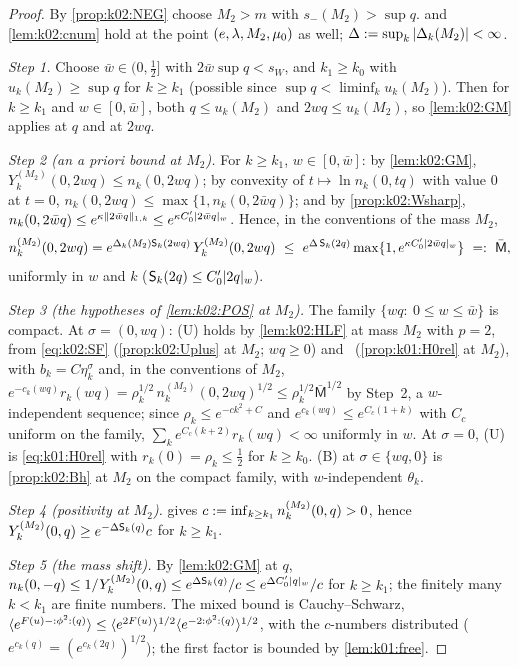 \begin{proof}
By \cref{prop:k02:NEG} choose $M_2>m$ with $s_-(M_2)>\sup q$.  and \cref{lem:k02:cnum} hold at the point $(e,\lambda,M_2,\mu_0)$ as well; $\Delta:=\sup_k|\Delta_k(M_2)|<\infty$.

\emph{Step 1.} Choose $\bar w\in(0,\frac12]$ with $2\bar w\sup q<s_W$, and $k_1\ge k_0$ with $u_k(M_2)\ge\sup q$ for $k\ge k_1$ (possible since $\sup q<\liminf_ku_k(M_2)$). Then for $k\ge k_1$ and $w\in[0,\bar w]$, both $q\le u_k(M_2)$ and $2wq\le u_k(M_2)$, so \cref{lem:k02:GM} applies at $q$ and at $2wq$.

\emph{Step 2 (an a priori bound at $M_2$).} For $k\ge k_1$, $w\in[0,\bar w]$: by \cref{lem:k02:GM}, $Y^{(M_2)}_k(0,2wq)\le n_k(0,2wq)$; by convexity of $t\mapsto\ln n_k(0,tq)$ with value $0$ at $t=0$, $n_k(0,2wq)\le\max\{1,n_k(0,2\bar wq)\}$; and by \cref{prop:k02:Wsharp}, $n_k(0,2\bar wq)\le e^{\kappa\lVert 2\bar wq\rVert_{1,k}}\le e^{\kappa C_0'\lvert 2\bar wq\rvert_{w}}$. Hence, in the conventions of the mass $M_2$,
\[
n^{(M_2)}_k(0,2wq)=e^{\Delta_k(M_2)\sS_k(2wq)}\,Y^{(M_2)}_k(0,2wq)\ \le\ e^{\Delta\,\sS_k(2q)}\max\{1,e^{\kappa C_0'\wnorm{2\bar wq}}\}\ =:\ \bar{\mathsf M},
\]
uniformly in $w$ and $k$ ($\mathsf S_k(2q)\le C_0'\lvert 2q\rvert_{w}$).

\emph{Step 3 (the hypotheses of \cref{lem:k02:POS} at $M_2$).} The family $\{wq:\ 0\le w\le\bar w\}$ is compact. At $\sigma=(0,wq)$: (U) holds by \cref{lem:k02:HLF} at mass $M_2$ with $p=2$, from \eqref{eq:k02:SF} (\cref{prop:k02:Uplus} at $M_2$; $wq\ge0$) and \Rzero\ (\cref{prop:k01:H0rel} at $M_2$), with $b_k=C\eta_k^\sigma$ and, in the conventions of $M_2$, $e^{-c_k(wq)}r_k(wq)=\rho_k^{1/2}\,n^{(M_2)}_k(0,2wq)^{1/2}\le\rho_k^{1/2}\bar{\mathsf M}^{1/2}$ by Step~2, a $w$-independent sequence; since $\rho_k\le e^{-ck^2+C}$ and $e^{c_k(wq)}\le e^{C_c(1+k)}$ with $C_c$ uniform on the family, $\sum_ke^{C_c(k+2)}r_k(wq)<\infty$ uniformly in $w$. At $\sigma=0$, (U) is \eqref{eq:k01:H0rel} with $r_k(0)=\rho_k\le\frac12$ for $k\ge k_0$. (B) at $\sigma\in\{wq,0\}$ is \cref{prop:k02:Bh} at $M_2$ on the compact family, with $w$-independent $\theta_k$.

\emph{Step 4 (positivity at $M_2$).}  gives $c:=\inf_{k\ge k_1}n^{(M_2)}_k(0,q)>0$, hence $Y^{(M_2)}_k(0,q)\ge e^{-\Delta\mathsf S_k(q)}c$ for $k\ge k_1$.

\emph{Step 5 (the mass shift).} By \cref{lem:k02:GM} at $q$, $n_k(0,-q)\le1/Y^{(M_2)}_k(0,q)\le e^{\Delta\mathsf S_k(q)}/c\le e^{\Delta C_0'\lvert q\rvert_{w}}/c$ for $k\ge k_1$; the finitely many $k<k_1$ are finite numbers. The mixed bound is Cauchy--Schwarz, $\langle e^{F(u)-{:}\phi^2{:}(q)}\rangle\le\langle e^{2F(u)}\rangle^{1/2}\langle e^{-2{:}\phi^2{:}(q)}\rangle^{1/2}$, with the $c$-numbers distributed ($e^{c_k(q)}=(e^{c_k(2q)})^{1/2}$); the first factor is bounded by \cref{lem:k01:free}.
\end{proof}

